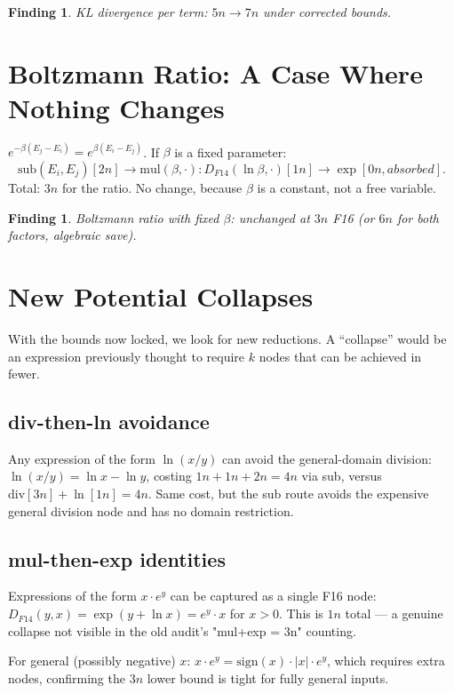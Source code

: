 \documentclass[11pt]{article}
\newtheorem{finding}[theorem]{Finding}
\begin{document}
\begin{finding}
KL divergence per term: $5n \to 7n$ under corrected bounds.
\end{finding}

\section{Boltzmann Ratio: A Case Where Nothing Changes}

$e^{-\beta(E_j - E_i)} = e^{\beta(E_i - E_j)}$. If $\beta$ is a fixed parameter:
\[
\mathrm{sub}(E_i, E_j)[2n] \to \text{mul}(\beta, \cdot): D_{F14}(\ln\beta, \cdot)[1n] \to \exp[0n, absorbed].
\]
Total: $3n$ for the ratio. No change, because $\beta$ is a constant, not a free variable.

\begin{finding}
Boltzmann ratio with fixed $\beta$: unchanged at $3n$ F16 (or $6n$ for both factors, algebraic save).
\end{finding}

\section{New Potential Collapses}

With the bounds now locked, we look for new reductions. A ``collapse'' would be an expression
previously thought to require $k$ nodes that can be achieved in fewer.

\subsection{div-then-ln avoidance}

Any expression of the form $\ln(x/y)$ can avoid the general-domain division:
$\ln(x/y) = \ln x - \ln y$, costing $1n + 1n + 2n = 4n$ via sub, versus $\mathrm{div}[3n] + \ln[1n] = 4n$. Same cost, but the sub route avoids the expensive general division node and has no domain restriction.

\subsection{mul-then-exp identities}

Expressions of the form $x \cdot e^y$ can be captured as a single F16 node:
$D_{F14}(y, x) = \exp(y + \ln x) = e^y \cdot x$ for $x > 0$. This is $1n$ total --- a genuine collapse
not visible in the old audit's "mul+exp = 3n" counting.

For general (possibly negative) $x$: $x \cdot e^y = \mathrm{sign}(x) \cdot |x| \cdot e^y$,
which requires extra nodes, confirming the $3n$ lower bound is tight for fully general inputs.
\end{document}
